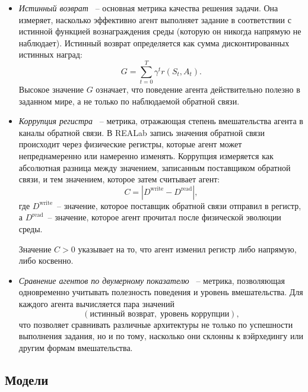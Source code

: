 \begin{itemize}

    \item \emph{Истинный возврат} ~-- основная метрика качества решения задачи.
    Она измеряет, насколько эффективно агент выполняет задание в соответствии 
    с истинной функцией вознаграждения среды (которую он никогда напрямую не 
    наблюдает). Истинный возврат определяется как сумма дисконтированных 
    истинных наград:
    \begin{equation}
        G = \sum_{t=0}^{T} \gamma^t r(S_t, A_t).
    \end{equation}
    Высокое значение $G$ означает, что поведение агента действительно полезно 
    в заданном мире, а не только по наблюдаемой обратной связи.

    \item \emph{Коррупция регистра} ~-- метрика, отражающая степень вмешательства 
    агента в каналы обратной связи. В REALab запись значения обратной связи 
    происходит через физические регистры, которые агент может непреднамеренно 
    или намеренно изменять. Коррупция измеряется как абсолютная разница между 
    значением, записанным поставщиком обратной связи, и тем значением, которое 
    затем считывает агент:
    \begin{equation}
        C = \left| D^\text{write} - D^\text{read} \right|,
    \end{equation}
    где $D^\text{write}$~-- значение, которое поставщик обратной связи отправил 
    в регистр, а $D^\text{read}$~-- значение, которое агент прочитал после 
    физической эволюции среды.
    
    Значение $C>0$ указывает на то, что агент изменил регистр либо напрямую, 
    либо косвенно.

    \item \emph{Сравнение агентов по двумерному показателю} ~-- метрика,
    позволяющая одновременно учитывать полезность поведения и уровень вмешательства. 
    Для каждого агента вычисляется пара значений
    \begin{equation}
        (\text{истинный возврат},\; \text{уровень коррупции}),
    \end{equation}
    что позволяет сравнивать различные архитектуры не только по успешности 
    выполнения задания, но и по тому, насколько они склонны к вэйрхедингу или 
    другим формам вмешательства.
\end{itemize}


\subsection{Модели}

